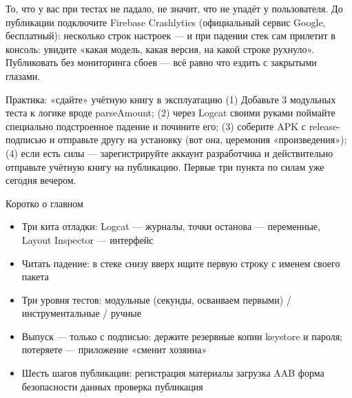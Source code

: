 
То, что у вас при тестах не падало, не значит, что не упадёт у пользователя. До публикации подключите Firebase Crashlytics (официальный сервис Google, бесплатный): несколько строк настроек — и при падении стек сам прилетит в консоль: увидите «какая модель, какая версия, на какой строке рухнуло». Публиковать без мониторинга сбоев — всё равно что ездить с закрытыми глазами.

\begin{tcbpractice}{Практика: «сдайте» учётную книгу в эксплуатацию}
(1) Добавьте 3 модульных теста к логике вроде parseAmount; (2) через Logcat своими руками поймайте специально подстроенное падение и почините его; (3) соберите APK с release-подписью и отправьте другу на установку (вот она, церемония «произведения»); (4) если есть силы — зарегистрируйте аккаунт разработчика и действительно отправьте учётную книгу на публикацию. Первые три пункта по силам уже сегодня вечером.

\end{tcbpractice}

\begin{tcbsummary}{Коротко о главном}
\begin{itemize}
  \item Три кита отладки: Logcat — журналы, точки останова — переменные, Layout Inspector — интерфейс
  \item Читать падение: в стеке снизу вверх ищите первую строку с именем своего пакета
  \item Три уровня тестов: модульные (секунды, осваиваем первыми) / инструментальные / ручные
  \item Выпуск — только с подписью: держите резервные копии keystore и пароля; потеряете — приложение «сменит хозяина»
  \item Шесть шагов публикации: регистрация материалы загрузка AAB форма безопасности данных проверка публикация
\end{itemize}

\end{tcbsummary}
